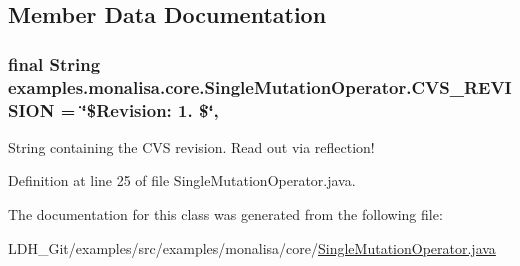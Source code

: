 \subsection{Member Data Documentation}
\hypertarget{classexamples_1_1monalisa_1_1core_1_1_single_mutation_operator_a37b7a3e5ba8363d445353068b28ef85b}{
\subsubsection[{C\-V\-S\-\_\-\-R\-E\-V\-I\-S\-I\-O\-N}]{\setlength{\rightskip}{0pt plus 5cm}final String examples.\-monalisa.\-core.\-Single\-Mutation\-Operator.\-C\-V\-S\-\_\-\-R\-E\-V\-I\-S\-I\-O\-N = \char`\"{}\$Revision\-: 1. \$\char`\"{}\hspace{0.3cm}{\ttfamily [static]}, {\ttfamily [private]}}}\label{classexamples_1_1monalisa_1_1core_1_1_single_mutation_operator_a37b7a3e5ba8363d445353068b28ef85b}
String containing the C\-V\-S revision. Read out via reflection! 

Definition at line 25 of file Single\-Mutation\-Operator.\-java.



The documentation for this class was generated from the following file\-:\begin{DoxyCompactItemize}
\item 
L\-D\-H\-\_\-\-Git/examples/src/examples/monalisa/core/\hyperlink{_single_mutation_operator_8java}{Single\-Mutation\-Operator.\-java}\end{DoxyCompactItemize}
